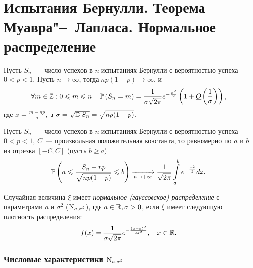 \section{Испытания Бернулли. Теорема Муавра"--~Лапласа. Нормальное распределение}

\begin{namedthm} 
    Пусть $S_n$~--- число успехов в $n$ испытаниях Бернулли с вероятностью успеха $0 < p < 1$. 
    Пусть $n \to \infty$, тогда $n p(1-p) {\longrightarrow} \infty$, и 
    \begin{equation*}
        \forall m \in \mathbb{Z}: 0 \leqslant m \leqslant n \quad \operatorname{\mathbb{P}}\left(S_{n}=m\right)=\frac{1}{\sigma \sqrt{2 \pi} } e^{-\frac{x^{2}}{2}}\left(1+\underline{O}\left(\frac{1}{\sigma}\right)\right),
    \end{equation*}
    где $x = \frac{m - np}{\sigma},$ а $\sigma=\sqrt{\operatorname{\mathbb{D}} S_{n}}=\sqrt{n p(1-p)}$.
\end{namedthm}  

\begin{namedthm}
    Пусть $S_n$~--- число успехов в $n$ испытаниях Бернулли с вероятностью успеха $0 < p < 1$, $C$~--- произвольная положительная константа, то равномерно по $a$ и $b$ из отрезка $[-C,C]$ (пусть $b \geqslant a$)
\begin{equation*}
    \operatorname{\mathbb{P}}\left(a \leqslant \frac{S_{n}-n p}{\sqrt{n p(1-p)}} \leqslant b\right) \xrightarrow[n \to +\infty]{} \frac{1}{\sqrt{2 \pi}} \int\limits_{a}^{b} e^{-\frac{x^{2}}{2}} dx.
\end{equation*}
\end{namedthm} 

\begin{defn}
    Случайная величина $\xi$ имеет \textit{нормальное (гауссовское) распределение} с параметрами $a$ и $\sigma^2$ ($\operatorname{\mathrm{N}}_{a, \sigma^2}$), где $a \in \mathbb{R}, \sigma > 0$, если $\xi$ имеет следующую плотность распределения: 
\begin{equation*}
    f(x)=\frac{1}{\sigma \sqrt{2 \pi}} e^{-\frac{(x-a)^{2}}{2 \sigma^{2}}}, \quad x \in \mathbb{R}.
\end{equation*}
\end{defn}

\subsubsection{Числовые характеристики $\operatorname{\mathrm{N}}_{a, \sigma^2}$}

